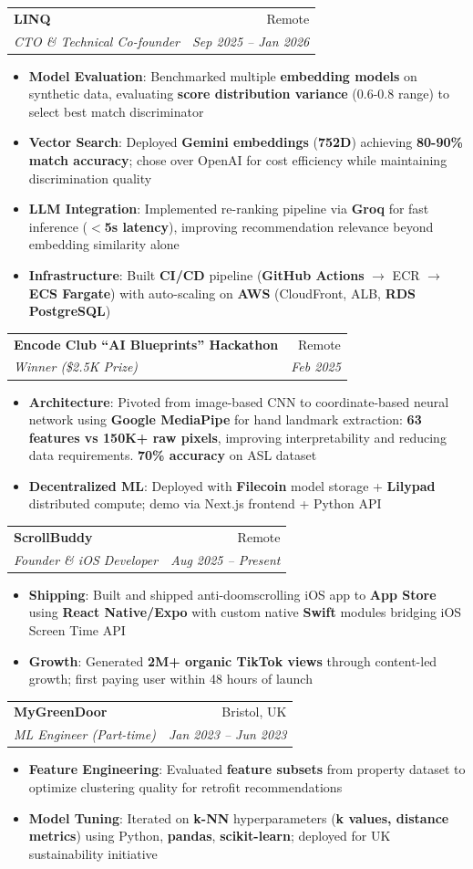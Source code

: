 \documentclass[letterpaper,11pt]{article}
\makeatletter
\newcommand{\resumeItem}[2]{
  \item\small{
    \textbf{#1}{: #2 \vspace{-2pt}}
  }
}
\newcommand{\resumeSubheading}[4]{
  \vspace{-1pt}\item
    \begin{tabular*}{0.97\textwidth}[t]{l@{\extracolsep{\fill}}r}
      \textbf{#1} & #2 \\
      \textit{\small#3} & \textit{\small #4} \\
    \end{tabular*}\vspace{-5pt}
}
\newcommand{\resumeItemListStart}{\begin{itemize}}
\newcommand{\resumeItemListEnd}{\end{itemize}\vspace{-5pt}}
\makeatother
\begin{document}
    \resumeSubheading
      {LINQ}{Remote}
      {CTO \& Technical Co-founder}{Sep 2025 -- Jan 2026}
      \resumeItemListStart
        \resumeItem{Model Evaluation}
          {Benchmarked multiple \textbf{embedding models} on synthetic data, evaluating \textbf{score distribution variance} (0.6-0.8 range) to select best match discriminator}
        \resumeItem{Vector Search}
          {Deployed \textbf{Gemini embeddings} (\textbf{752D}) achieving \textbf{80-90\% match accuracy}; chose over OpenAI for cost efficiency while maintaining discrimination quality}
        \resumeItem{LLM Integration}
          {Implemented re-ranking pipeline via \textbf{Groq} for fast inference (\textbf{$<$5s latency}), improving recommendation relevance beyond embedding similarity alone}
        \resumeItem{Infrastructure}
          {Built \textbf{CI/CD} pipeline (\textbf{GitHub Actions} $\rightarrow$ ECR $\rightarrow$ \textbf{ECS Fargate}) with auto-scaling on \textbf{AWS} (CloudFront, ALB, \textbf{RDS PostgreSQL})}
      \resumeItemListEnd

    \resumeSubheading
      {Encode Club ``AI Blueprints'' Hackathon}{Remote}
      {Winner (\$2.5K Prize)}{Feb 2025}
      \resumeItemListStart
        \resumeItem{Architecture}
          {Pivoted from image-based CNN to coordinate-based neural network using \textbf{Google MediaPipe} for hand landmark extraction: \textbf{63 features vs 150K+ raw pixels}, improving interpretability and reducing data requirements. \textbf{70\% accuracy} on ASL dataset}
        \resumeItem{Decentralized ML}
          {Deployed with \textbf{Filecoin} model storage + \textbf{Lilypad} distributed compute; demo via Next.js frontend + Python API}
      \resumeItemListEnd

    \resumeSubheading
      {ScrollBuddy}{Remote}
      {Founder \& iOS Developer}{Aug 2025 -- Present}
      \resumeItemListStart
        \resumeItem{Shipping}
          {Built and shipped anti-doomscrolling iOS app to \textbf{App Store} using \textbf{React Native/Expo} with custom native \textbf{Swift} modules bridging iOS Screen Time API}
        \resumeItem{Growth}
          {Generated \textbf{2M+ organic TikTok views} through content-led growth; first paying user within 48 hours of launch}
      \resumeItemListEnd

    \resumeSubheading
      {MyGreenDoor}{Bristol, UK}
      {ML Engineer (Part-time)}{Jan 2023 -- Jun 2023}
      \resumeItemListStart
        \resumeItem{Feature Engineering}
          {Evaluated \textbf{feature subsets} from property dataset to optimize clustering quality for retrofit recommendations}
        \resumeItem{Model Tuning}
          {Iterated on \textbf{k-NN} hyperparameters (\textbf{k values, distance metrics}) using Python, \textbf{pandas}, \textbf{scikit-learn}; deployed for UK sustainability initiative}
      \resumeItemListEnd
\end{document}

